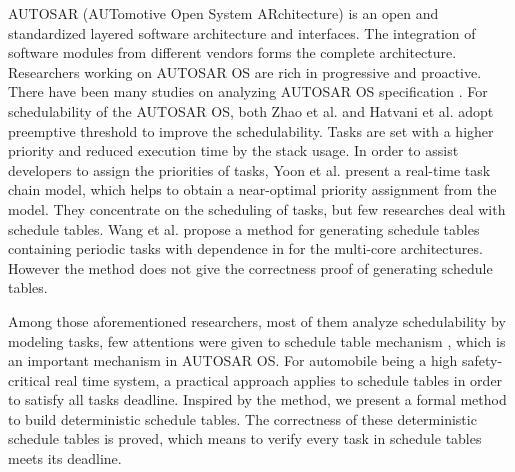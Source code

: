 \documentclass[conference]{IEEEtran}
\begin{document}
AUTOSAR (AUTomotive Open System ARchitecture) \cite{autosar} is an open and standardized layered software architecture and interfaces. The integration of software modules from different vendors forms the complete architecture. %
Researchers working on AUTOSAR OS are rich in progressive and proactive. There have been many studies on analyzing AUTOSAR OS specification \cite{DBLP:conf/isorc/AnssiTKGT11}. 
For schedulability of the AUTOSAR OS, both Zhao et al. \cite{DBLP:journals/jsa/ZhaoGZ17} and Hatvani et al. \cite{DBLP:conf/etfa/HatvaniB15} adopt preemptive threshold to improve the schedulability. Tasks are set with a higher priority and reduced execution time by the stack usage. In order to assist developers to assign the priorities of tasks, Yoon et al. \cite{DBLP:conf/racs/YoonR14} present a real-time task chain model, which helps to obtain a near-optimal priority assignment from the model. They concentrate on the scheduling of tasks, but few researches deal with schedule tables. Wang et al. propose a method for generating schedule tables containing periodic tasks with dependence in \cite{DBLP:conf/dasip/WangCM16} for the multi-core architectures. However the method does not give the correctness proof of generating schedule tables.

Among those aforementioned researchers, most of them analyze schedulability by modeling tasks, few attentions were given to schedule table mechanism \cite{autosar}, which is an important mechanism in AUTOSAR OS. For automobile being a high safety-critical real time system, a practical approach \cite{DBLP:journals/rts/BakerS89} applies to schedule tables in order to satisfy all tasks deadline. Inspired by the method, we present a formal method to build deterministic schedule tables. The correctness of these deterministic schedule tables is proved, which means to verify every task in schedule tables meets its deadline.
\end{document}
